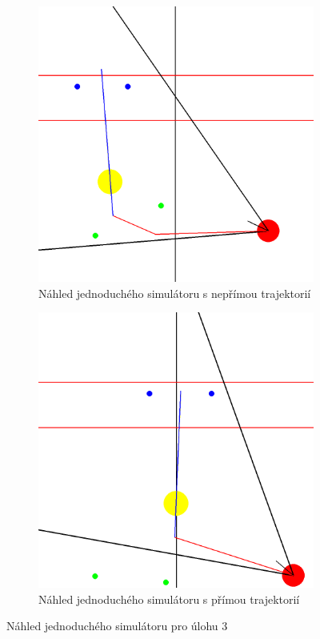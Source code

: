 \documentclass[a4paper,12pt]{article}
\begin{document}
\begin{figure}
	\centering
	\begin{subfigure}{0.45\linewidth}
			\includegraphics[width=\textwidth]{pictures/sim_002.png}
		\caption{Náhled jednoduchého simulátoru s nepřímou trajektorií}
		\label{fig:fig_sim_a}
	\end{subfigure}
	\begin{subfigure}{0.45\linewidth}
		\includegraphics[width=\textwidth]{pictures/sim_001.png}
		\caption{Náhled jednoduchého simulátoru s přímou trajektorií}
		\label{fig:fig_sim_b}
	\end{subfigure}
	\caption{Náhled jednoduchého simulátoru pro úlohu 3}
\end{figure} 
\end{document}
